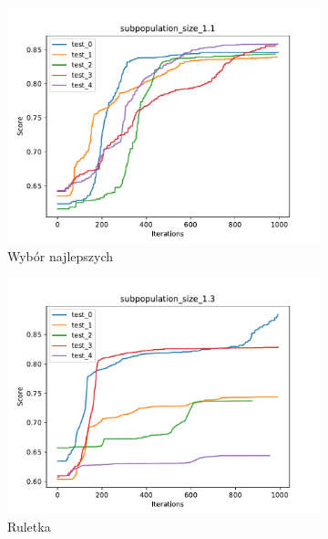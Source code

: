 \begin{figure}[H]
    \centering 
    \begin{subfigure}[b]{0.49\linewidth}
        \includegraphics[width=\linewidth]{img/subpopulation_size_1.1.pdf}
        \caption{Wybór najlepszych}
    \end{subfigure}
    \begin{subfigure}[b]{0.49\linewidth}
        \includegraphics[width=\linewidth]{img/subpopulation_size_1.3.pdf}
        \caption{Ruletka}
    \end{subfigure}
    \begin{subfigure}[b]{0.49\linewidth}

\end{subfigure}
\end{figure}
